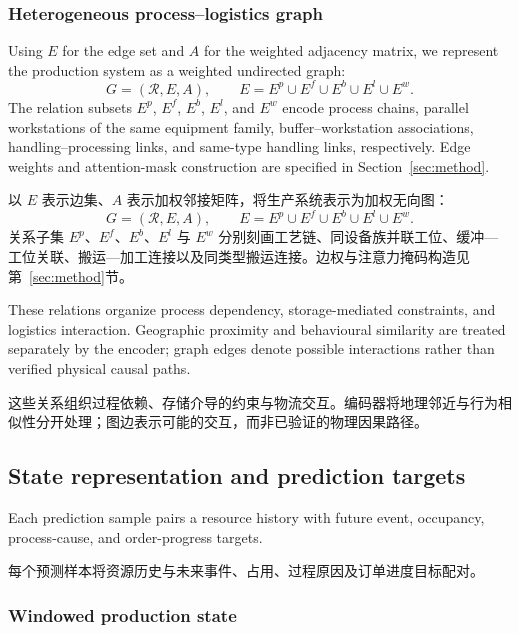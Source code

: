 \documentclass[a4paper,fleqn]{cas-dc}
\newcommand{\zhpara}[1]{%
  \par\begingroup\small\color{black!72}\noindent #1\par\endgroup}
\begin{document}
\subsubsection{Heterogeneous process--logistics graph}

Using $E$ for the edge set and $A$ for the weighted adjacency matrix, we represent the production system as a weighted undirected graph:
\begin{equation}
G=(\mathcal{R},E,A),\qquad
E=E^{p}\cup E^{f}\cup E^{b}\cup E^{l}\cup E^{w}.
\end{equation}
The relation subsets $E^{p}$, $E^{f}$, $E^{b}$, $E^{l}$, and $E^{w}$ encode process chains, parallel workstations of the same equipment family, buffer--workstation associations, handling--processing links, and same-type handling links, respectively. Edge weights and attention-mask construction are specified in Section~\ref{sec:method}.

\zhpara{以 $E$ 表示边集、$A$ 表示加权邻接矩阵，将生产系统表示为加权无向图：
\begin{equation}
G=(\mathcal{R},E,A),\qquad
E=E^{p}\cup E^{f}\cup E^{b}\cup E^{l}\cup E^{w}.
\end{equation}
关系子集 $E^{p}$、$E^{f}$、$E^{b}$、$E^{l}$ 与 $E^{w}$ 分别刻画工艺链、同设备族并联工位、缓冲—工位关联、搬运—加工连接以及同类型搬运连接。边权与注意力掩码构造见第~\ref{sec:method}节。}


These relations organize process dependency, storage-mediated constraints, and logistics interaction. Geographic proximity and behavioural similarity are treated separately by the encoder; graph edges denote possible interactions rather than verified physical causal paths.

\zhpara{这些关系组织过程依赖、存储介导的约束与物流交互。编码器将地理邻近与行为相似性分开处理；图边表示可能的交互，而非已验证的物理因果路径。}


\subsection{State representation and prediction targets}

Each prediction sample pairs a resource history with future event, occupancy, process-cause, and order-progress targets.

\zhpara{每个预测样本将资源历史与未来事件、占用、过程原因及订单进度目标配对。}


\subsubsection{Windowed production state}
\end{document}

